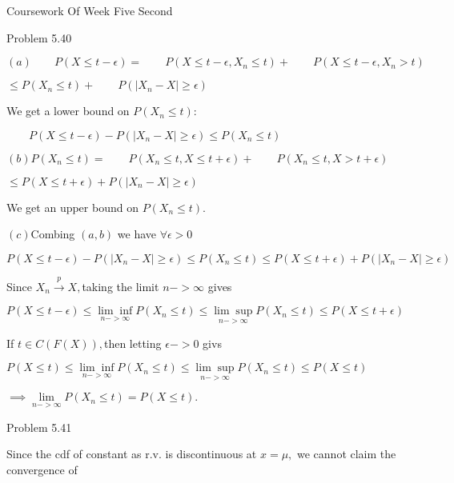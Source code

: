 \documentclass{article}
\begin{document}
Coursework Of Week Five Second\bigskip 

Problem 5.40

$\left( a\right) \qquad P\left( X\leq t-\epsilon \right) =\qquad P\left(
X\leq t-\epsilon ,X_{n}\leq t\right) +\qquad P\left( X\leq t-\epsilon
,X_{n}>t\right) $

$\leq P\left( X_{n}\leq t\right) +\qquad P\left( \left\vert
X_{n}-X\right\vert \geq \epsilon \right) $

We get a lower bound on $P\left( X_{n}\leq t\right) :$

$\qquad P\left( X\leq t-\epsilon \right) -P\left( \left\vert
X_{n}-X\right\vert \geq \epsilon \right) \leq P\left( X_{n}\leq t\right) $

$\left( b\right) P\left( X_{n}\leq t\right) =\qquad P\left( X_{n}\leq
t,X\leq t+\epsilon \right) +\qquad P\left( X_{n}\leq t,X>t+\epsilon \right) $

$\leq P\left( X\leq t+\epsilon \right) +P\left( \left\vert
X_{n}-X\right\vert \geq \epsilon \right) $

We get an upper bound on $P\left( X_{n}\leq t\right) .$

$\left( c\right) $Combing $\left( a,b\right) $ we have $\forall \epsilon >0$

$P\left( X\leq t-\epsilon \right) -P\left( \left\vert X_{n}-X\right\vert
\geq \epsilon \right) \leq P\left( X_{n}\leq t\right) \leq P\left( X\leq
t+\epsilon \right) +P\left( \left\vert X_{n}-X\right\vert \geq \epsilon
\right) $

Since $X_{n}\overset{p}{\rightarrow }X,$taking the limit $n->\infty $ gives

$P\left( X\leq t-\epsilon \right) \leq \underset{n->\infty }{\lim \inf }%
P\left( X_{n}\leq t\right) \leq \underset{n->\infty }{\lim \sup }P\left(
X_{n}\leq t\right) \leq P\left( X\leq t+\epsilon \right) $

If $t\in C\left( F\left( X\right) \right) ,$then letting $\epsilon ->0$ givs

$P\left( X\leq t\right) \leq \underset{n->\infty }{\lim \inf }P\left(
X_{n}\leq t\right) \leq \underset{n->\infty }{\lim \sup }P\left( X_{n}\leq
t\right) \leq P\left( X\leq t\right) $

$\implies \underset{n->\infty }{\lim }P\left( X_{n}\leq t\right) =P\left(
X\leq t\right) .$

Problem 5.41

\bigskip Since the cdf of constant as r.v. is discontinuous at $x=\mu ,$ we
cannot claim the convergence of 
\end{document}
